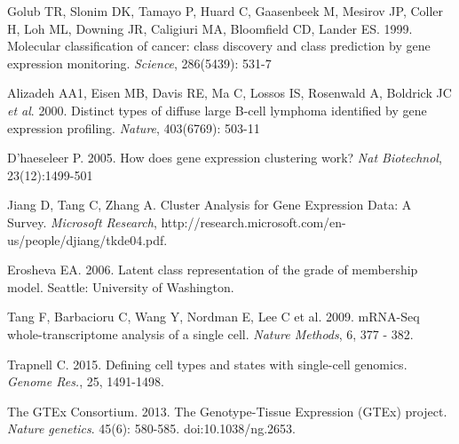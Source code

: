 \documentclass[10pt,letterpaper]{article}
\begin{document}
\begin{thebibliography}{9}
Golub TR, Slonim DK, Tamayo P, Huard C, Gaasenbeek M, Mesirov JP, Coller H, Loh ML, Downing JR, Caligiuri MA, Bloomfield CD, Lander ES. 1999.
Molecular classification of cancer: class discovery and class prediction by gene expression monitoring.
\textit{Science}, 286(5439): 531-7

Alizadeh AA1, Eisen MB, Davis RE, Ma C, Lossos IS, Rosenwald A, Boldrick JC \textit{et al}. 2000.
Distinct types of diffuse large B-cell lymphoma identified by gene expression profiling.
\textit{Nature}, 403(6769):  503-11

D'haeseleer P. 2005.
How does gene expression clustering work?
\textit{Nat Biotechnol}, 23(12):1499-501

Jiang D, Tang C, Zhang A.
Cluster Analysis for Gene Expression Data: A Survey.
\textit{Microsoft Research}, http://research.microsoft.com/en-us/people/djiang/tkde04.pdf.

Erosheva EA. 2006.
Latent class representation of the grade of membership model.
Seattle: University of Washington.

Tang F,  Barbacioru C,  Wang Y,  Nordman E,  Lee C  et al. 2009.
mRNA-Seq whole-transcriptome analysis of a single cell.
\textit{Nature Methods}, 6, 377 - 382.

Trapnell C. 2015.
Defining cell types and states with single-cell genomics.
\textit{Genome Res.},  25, 1491-1498.




The GTEx Consortium. 2013.
The Genotype-Tissue Expression (GTEx) project.
\textit{Nature genetics}. 45(6): 580-585. doi:10.1038/ng.2653.


\end{thebibliography}
\end{document}
